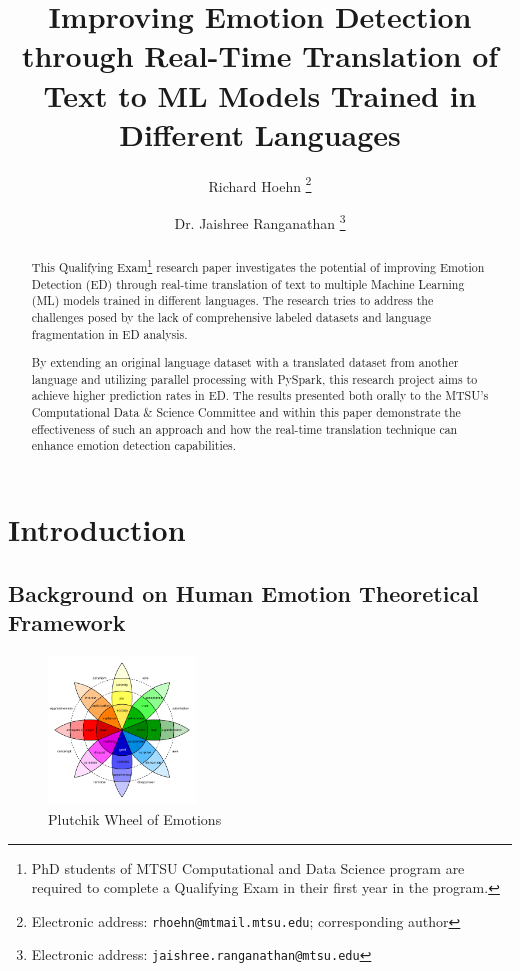 \documentclass[11pt]{article}
\title{Improving Emotion Detection through Real-Time Translation of Text to ML Models Trained in Different Languages}
\author{Richard Hoehn%
	\thanks{Electronic address: \texttt{rhoehn@mtmail.mtsu.edu}; corresponding author}}
\affil{Middle Tennessee State University}
\author{Dr. Jaishree Ranganathan%
	\thanks{Electronic address: \texttt{jaishree.ranganathan@mtsu.edu}}}
\affil{Middle Tennessee State University}
\begin{document}
\maketitle

\begin{abstract}
This Qualifying Exam\footnote{PhD students of MTSU Computational and Data  Science program are required to complete a Qualifying Exam in their first year in the program.} research paper investigates the potential of improving Emotion Detection (ED) through real-time translation of text to multiple Machine Learning (ML) models trained in different languages. The research tries to address the challenges posed by the lack of comprehensive labeled datasets and language fragmentation in ED analysis.

By extending an original language dataset with a translated dataset from another language and utilizing parallel processing with PySpark, this research project aims to achieve higher prediction rates in ED. The results presented both orally to the MTSU's Computational Data \& Science Committee and within this paper demonstrate the effectiveness of such an approach and how the real-time translation technique can enhance emotion detection capabilities.
\end{abstract}
\clearpage

\tableofcontents
\clearpage

\section{Introduction}
\subsection{Background on Human Emotion Theoretical Framework}

\begin{figure} %
    \centering
    \includegraphics[width=0.35\textwidth]{Plutchik-Wheel}
    \caption{Plutchik Wheel of Emotions}
    \label{fig:plutchik-wheel}
\end{figure}
\end{document}
